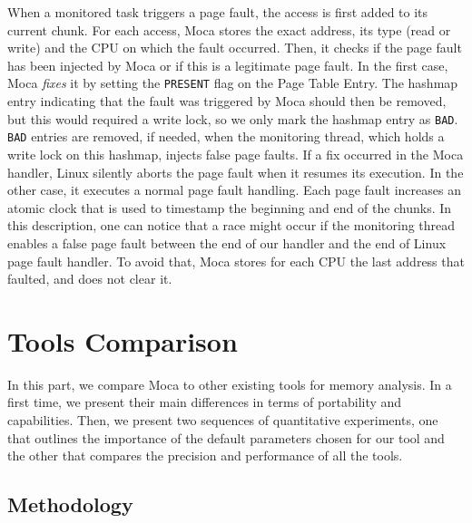 When a monitored task triggers a page fault, the access is first added to its current chunk.
For each access, \gls{Moca} stores the exact address, its type (read or write) and the CPU on which the fault occurred.
Then, it checks if the page fault has been injected by \gls{Moca} or if this is a legitimate page fault.
In the first case, \gls{Moca} \emph{fixes} it by setting the \texttt{PRESENT} flag on the Page Table Entry.
The hashmap entry indicating that the fault was triggered by \gls{Moca} should then be removed, but this would required a write lock, so we only mark the hashmap entry as \texttt{BAD}.
\texttt{BAD} entries are removed, if needed, when the monitoring thread, which holds a write lock on this hashmap, injects false page faults.
If a fix occurred in the \gls{Moca} handler, Linux silently aborts the page fault when it resumes its execution.
In the other case, it executes a normal page fault handling.
Each page fault increases an atomic clock that is used to timestamp the beginning and end of the chunks.
In this description, one can notice that a race might occur if the monitoring thread enables a false page fault between the end of our handler and the end of Linux page fault handler.
To avoid that, \gls{Moca} stores for each CPU the last address that faulted, and does not clear it.


\section{Tools Comparison}
\label{sec:Tools-Comp}

In this part, we compare \gls{Moca} to other existing tools for memory analysis. In a first time, we present their main differences in terms of portability
and capabilities. Then, we present two sequences of quantitative experiments, one that outlines the importance of the default parameters chosen for our tool
and the other that compares the precision and performance of all the tools.


\subsection{Methodology}

